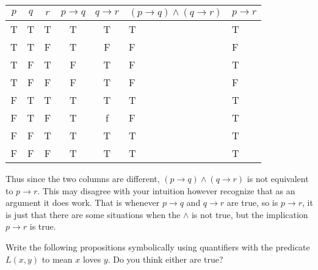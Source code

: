 \documentclass[addpoints, answers]{exam}
\begin{document}
\begin{questions}
\begin{parts}
\begin{solution}
      \begin{tabular}[h]{c | c | c | c | c | a | a}
        $p$ & $q$ & $r$ & $p\rightarrow q$ & $q\rightarrow r$ & $(p\rightarrow
        q) \wedge (q \rightarrow r)$ & $p\rightarrow r$\\
        \hline
        T & T & T & T & T & T & T\\
        T & T & F & T & F & F & F\\
        T & F & T & F & T & F & T\\
        T & F & F & F & T & F & F\\
        F & T & T & T & T & T & T\\
        F & T & F & T & f & F & T\\
        F & F & T & T & T & T & T\\
        F & F & F & T & T & T & T
      \end{tabular}

      Thus since the two columns are different, $(p\rightarrow q) \wedge 
      (q\rightarrow r)$ is not equivalent to $p\rightarrow r$. This may disagree
      with your intuition however recognize that as an argument it does work.
      That is whenever $p\rightarrow q$ and $q\rightarrow r$ are true, so is
      $p\rightarrow r$, it is just that there are some situations when the
      $\wedge$ is not true, but the implication $p\rightarrow r$ is true. 
    \end{solution}

  \end{parts}

  \question[6] Write the following propositions symbolically using quantifiers
  with the predicate $L(x,y)$ to mean $x$ loves $y$. Do you think either are
  true?
\end{questions}
\end{document}
